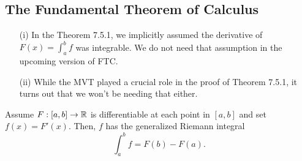 \subsection{The Fundamental Theorem of Calculus}

\begin{enumerate}
    \item[(i)] In the Theorem 7.5.1, we implicitly assumed the derivative of \( F(x) = \int_{ a }^{ b } f  \) was integrable. We do not need that assumption in the upcoming version of FTC.
    \item[(ii)] While the MVT played a crucial role in the proof of Theorem 7.5.1, it turns out that we won't be needing that either.
\end{enumerate}

\begin{theorem}
    Assume \( F: [a,b] \to \mathbb{R}  \) is differentiable at each point in \( [a,b]  \) and set \( f(x) = F'(x)  \). Then, \( f  \) has the generalized Riemann integral
    \[  \int_{ a }^{ b } f  = F(b) - F(a). \]
\end{theorem}

